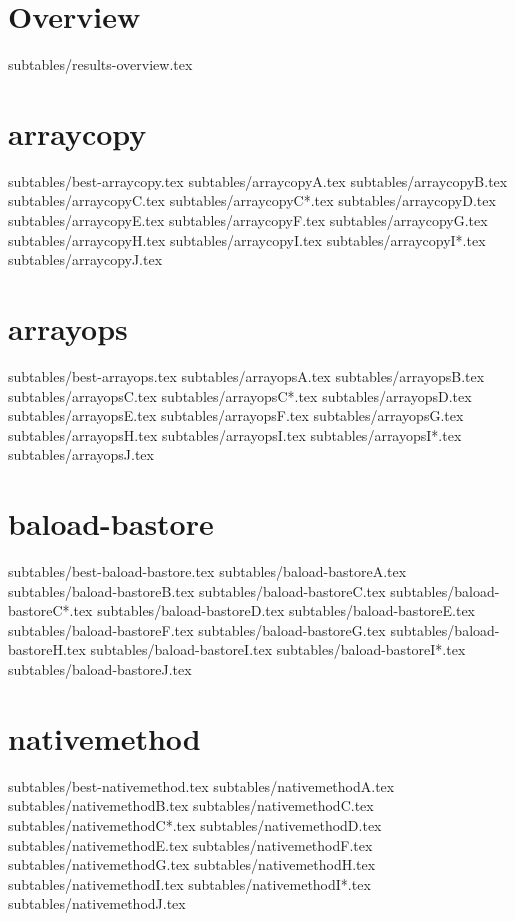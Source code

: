 \section{Overview}
    {subtables/results-overview.tex}
\section{arraycopy}
    {subtables/best-arraycopy.tex}
    {subtables/arraycopyA.tex}
    {subtables/arraycopyB.tex}
    {subtables/arraycopyC.tex}
    {subtables/arraycopyC*.tex}
    {subtables/arraycopyD.tex}
    {subtables/arraycopyE.tex}
    {subtables/arraycopyF.tex}
    {subtables/arraycopyG.tex}
    {subtables/arraycopyH.tex}
    {subtables/arraycopyI.tex}
    {subtables/arraycopyI*.tex}
    {subtables/arraycopyJ.tex}
\newpage
\section{arrayops}
    {subtables/best-arrayops.tex}
    {subtables/arrayopsA.tex}
    {subtables/arrayopsB.tex}
    {subtables/arrayopsC.tex}
    {subtables/arrayopsC*.tex}
    {subtables/arrayopsD.tex}
    {subtables/arrayopsE.tex}
    {subtables/arrayopsF.tex}
    {subtables/arrayopsG.tex}
    {subtables/arrayopsH.tex}
    {subtables/arrayopsI.tex}
    {subtables/arrayopsI*.tex}
    {subtables/arrayopsJ.tex}
\newpage
\section{baload-bastore}
    {subtables/best-baload-bastore.tex}
    {subtables/baload-bastoreA.tex}
    {subtables/baload-bastoreB.tex}
    {subtables/baload-bastoreC.tex}
    {subtables/baload-bastoreC*.tex}
    {subtables/baload-bastoreD.tex}
    {subtables/baload-bastoreE.tex}
    {subtables/baload-bastoreF.tex}
    {subtables/baload-bastoreG.tex}
    {subtables/baload-bastoreH.tex}
    {subtables/baload-bastoreI.tex}
    {subtables/baload-bastoreI*.tex}
    {subtables/baload-bastoreJ.tex}
\newpage
\section{nativemethod}
    {subtables/best-nativemethod.tex}
    {subtables/nativemethodA.tex}
    {subtables/nativemethodB.tex}
    {subtables/nativemethodC.tex}
    {subtables/nativemethodC*.tex}
    {subtables/nativemethodD.tex}
    {subtables/nativemethodE.tex}
    {subtables/nativemethodF.tex}
    {subtables/nativemethodG.tex}
    {subtables/nativemethodH.tex}
    {subtables/nativemethodI.tex}
    {subtables/nativemethodI*.tex}
    {subtables/nativemethodJ.tex}
\newpage
